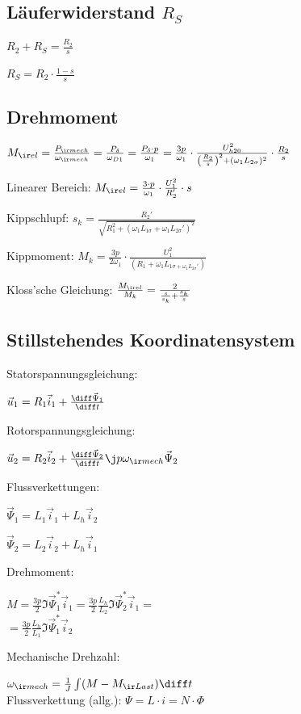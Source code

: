 \documentclass[german]{latex4ei_fs}
\begin{document}
\begin{sectionbox}
\subsection{Läuferwiderstand $R_S$}

$R_2 + R_S = \frac{R_2}{s}$

$R_S = R_2 \cdot \frac{1 - s}{s}$ 
\end{sectionbox}

\begin{sectionbox}
\subsection{Drehmoment}

$M_{\ir el} = \frac{P_{\ir mech}}{\omega_{\ir mech}} = \frac{P_\delta}{\omega_{D1}} = \frac{P_\delta \cdot p}{\omega_1} = \frac{3 p }{\omega_1} \cdot \frac{U_{h20}^2}{\left(\frac{R_2}{s}\right)^2 + (\omega_1 L_{2 \sigma})^2} \cdot \frac{R_2}{s}$

Linearer Bereich: $M_{\ir el} = \frac{3 \cdot p}{\omega_1} \cdot \frac{U_1^2}{R_2'} \cdot s$

Kippschlupf: $s_k = \frac{R_2'}{\sqrt{R_1^2 + (\omega_1 L_{1 \sigma} + \omega_1 L_{2 \sigma}')^2}}$

Kippmoment: $M_k = \frac{3p}{2 \omega_1} \cdot \frac{U_1^2}{(R_1 + \omega_1 L_{1 \sigma + \omega_1 L_{2 \sigma}'})}$

Kloss'sche Gleichung: $\frac{M_{\ir el}}{M_k} = \frac{2}{\frac{s}{s_k} + \frac{s_k}{s}}$
\end{sectionbox}

\begin{sectionbox}
\subsection{Stillstehendes Koordinatensystem}

Statorspannungsgleichung:

$\vec u_1 = R_1 \vec i_1 + \frac{\diff \vec \Psi_1}{\diff t}$ 

Rotorspannungsgleichung: 

$\vec u_2 = R_2 \vec i_2 + \frac{\diff \vec \Psi_2}{\diff t}  \j p \omega_{\ir mech} \vec \Psi_2$

Flussverkettungen: 

$\vec \Psi_1 = L_1 \vec i_1 + L_h \vec i_2$

$\vec \Psi_2  = L_2 \vec i_2 + L_h \vec i_1$


Drehmoment:

$M = \frac{3p}{2} \Im{\vec \Psi_1^* \vec i_1} = \frac{3p}{2} \frac{L_h}{L_2} \Im{\vec \Psi_2^* \vec i_1} = $ \\ $ = \frac{3p}{2} \frac{L_h}{L_1} \Im{\vec \Psi_1^* \vec i_2} $ 

Mechanische Drehzahl: 

$\omega_{\ir mech} = \frac{1}{J} \int (M - M_{\ir Last}) \diff t$ \\

Flussverkettung (allg.): $\Psi = L \cdot i = N \cdot \Phi$
\end{sectionbox}
\end{document}

